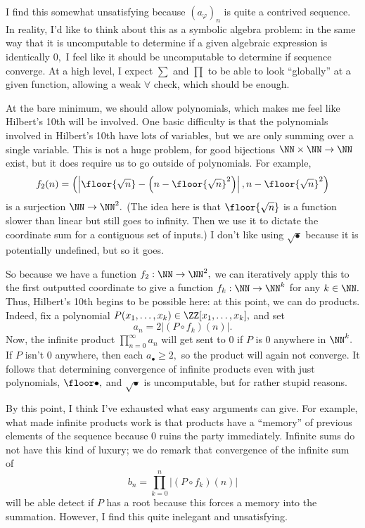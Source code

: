 I find this somewhat unsatisfying because $(a_\varphi)_n$ is quite a contrived sequence. In reality, I'd like to think about this as a symbolic algebra problem: in the same way that it is uncomputable to determine if a given algebraic expression is identically $0,$ I feel like it should be uncomputable to determine if sequence converge. At a high level, I expect $\sum$ and $\prod$ to be able to look ``globally'' at a given function, allowing a weak $\forall$ check, which should be enough.

At the bare minimum, we should allow polynomials, which makes me feel like Hilbert's 10th will be involved. One basic difficulty is that the polynomials involved in Hilbert's 10th have lots of variables, but we are only summing over a single variable. This is not a huge problem, for good bijections $\NN\times\NN\to\NN$ exist, but it does require us to go outside of polynomials. For example,
\[f_2(n)=\left(\left|\floor{\sqrt n}-\left(n-\floor{\sqrt n}^2\right)\right|,n-\floor{\sqrt n}^2\right)\]
is a surjection $\NN\to\NN^2.$ (The idea here is that $\floor{\sqrt n}$ is a function slower than linear but still goes to infinity. Then we use it to dictate the coordinate sum for a contiguous set of inputs.) I don't like using $\sqrt\bullet$ because it is potentially undefined, but so it goes.

So because we have a function $f_2:\NN\to\NN^2,$ we can iteratively apply this to the first outputted coordinate to give a function $f_k:\NN\to\NN^k$ for any $k\in\NN.$ Thus, Hilbert's 10th begins to be possible here: at this point, we can do products. Indeed, fix a polynomial $P(x_1,\ldots,x_k)\in\ZZ[x_1,\ldots,x_k],$ and set
\[a_n=2|(P\circ f_k)(n)|.\]
Now, the infinite product $\prod_{n=0}^\infty a_n$ will get sent to $0$ if $P$ is $0$ anywhere in $\NN^k.$ If $P$ isn't $0$ anywhere, then each $a_\bullet\ge2,$ so the product will again not converge. It follows that determining convergence of infinite products even with just polynomials, $\floor\bullet,$ and $\sqrt\bullet$ is uncomputable, but for rather stupid reasons.

By this point, I think I've exhausted what easy arguments can give. For example, what made infinite products work is that products have a ``memory'' of previous elements of the sequence because $0$ ruins the party immediately. Infinite sums do not have this kind of luxury; we do remark that convergence of the infinite sum of
\[b_n=\prod_{k=0}^n|(P\circ f_k)(n)|\]
will be able detect if $P$ has a root because this forces a memory into the summation. However, I find this quite inelegant and unsatisfying.

